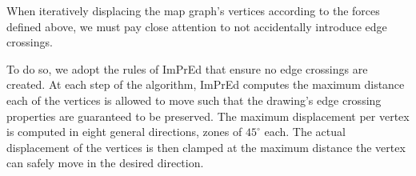 When iteratively displacing the map graph's vertices according to the forces defined above, we must pay close attention to not accidentally introduce edge crossings.

To do so, we adopt the rules of ImPrEd \cite{simonetto2011impred} that ensure no edge crossings are created.
At each step of the algorithm, ImPrEd computes the maximum distance each of the vertices is allowed to move such that the drawing's edge crossing properties are guaranteed to be preserved.
The maximum displacement per vertex is computed in eight general directions, zones of $45^\circ$ each.
The actual displacement of the vertices is then clamped at the maximum distance the vertex can safely move in the desired direction.
